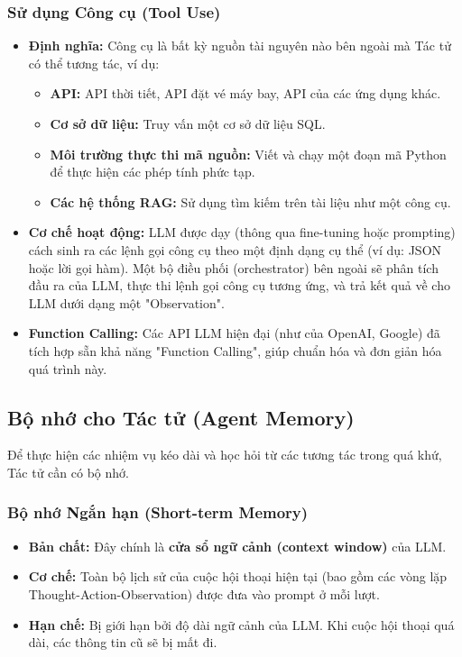 \subsubsection{Sử dụng Công cụ (Tool Use)}
\begin{itemize}
    \item \textbf{Định nghĩa:} Công cụ là bất kỳ nguồn tài nguyên nào bên ngoài mà Tác tử có thể tương tác, ví dụ:
        \begin{itemize}
            \item \textbf{API:} API thời tiết, API đặt vé máy bay, API của các ứng dụng khác.
            \item \textbf{Cơ sở dữ liệu:} Truy vấn một cơ sở dữ liệu SQL.
            \item \textbf{Môi trường thực thi mã nguồn:} Viết và chạy một đoạn mã Python để thực hiện các phép tính phức tạp.
            \item \textbf{Các hệ thống RAG:} Sử dụng tìm kiếm trên tài liệu như một công cụ.
        \end{itemize}
    \item \textbf{Cơ chế hoạt động:} LLM được dạy (thông qua fine-tuning hoặc prompting) cách sinh ra các lệnh gọi công cụ theo một định dạng cụ thể (ví dụ: JSON hoặc lời gọi hàm). Một bộ điều phối (orchestrator) bên ngoài sẽ phân tích đầu ra của LLM, thực thi lệnh gọi công cụ tương ứng, và trả kết quả về cho LLM dưới dạng một "Observation".
    \item \textbf{Function Calling:} Các API LLM hiện đại (như của OpenAI, Google) đã tích hợp sẵn khả năng "Function Calling", giúp chuẩn hóa và đơn giản hóa quá trình này.
\end{itemize}

\subsection{Bộ nhớ cho Tác tử (Agent Memory)}
\label{ssec:agent_memory}
Để thực hiện các nhiệm vụ kéo dài và học hỏi từ các tương tác trong quá khứ, Tác tử cần có bộ nhớ.

\subsubsection{Bộ nhớ Ngắn hạn (Short-term Memory)}
\begin{itemize}
    \item \textbf{Bản chất:} Đây chính là \textbf{cửa sổ ngữ cảnh (context window)} của LLM.
    \item \textbf{Cơ chế:} Toàn bộ lịch sử của cuộc hội thoại hiện tại (bao gồm các vòng lặp Thought-Action-Observation) được đưa vào prompt ở mỗi lượt.
    \item \textbf{Hạn chế:} Bị giới hạn bởi độ dài ngữ cảnh của LLM. Khi cuộc hội thoại quá dài, các thông tin cũ sẽ bị mất đi.
\end{itemize}

